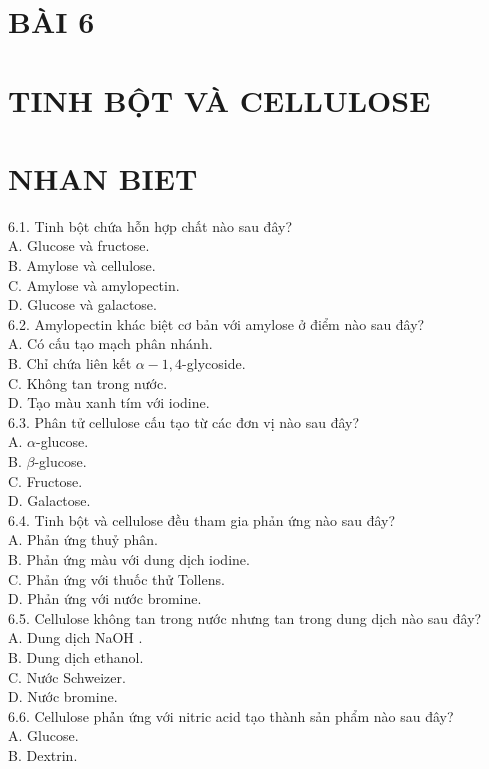 \documentclass[10pt]{article}
\begin{document}
\section*{BÀI 6}
\section*{TINH BỘT VÀ CELLULOSE}
\section*{NHAN BIET}
6.1. Tinh bột chứa hỗn hợp chất nào sau đây?\\
A. Glucose và fructose.\\
B. Amylose và cellulose.\\
C. Amylose và amylopectin.\\
D. Glucose và galactose.\\
6.2. Amylopectin khác biệt cơ bản với amylose ở điểm nào sau đây?\\
A. Có cấu tạo mạch phân nhánh.\\
B. Chỉ chứa liên kết $\alpha-1,4$-glycoside.\\
C. Không tan trong nước.\\
D. Tạo màu xanh tím với iodine.\\
6.3. Phân tử cellulose cấu tạo từ các đơn vị nào sau đây?\\
A. $\alpha$-glucose.\\
B. $\beta$-glucose.\\
C. Fructose.\\
D. Galactose.\\
6.4. Tinh bột và cellulose đều tham gia phản ứng nào sau đây?\\
A. Phản ứng thuỷ phân.\\
B. Phản ứng màu với dung dịch iodine.\\
C. Phản ứng với thuốc thử Tollens.\\
D. Phản ứng với nước bromine.\\
6.5. Cellulose không tan trong nước nhưng tan trong dung dịch nào sau đây?\\
A. Dung dịch NaOH .\\
B. Dung dịch ethanol.\\
C. Nước Schweizer.\\
D. Nước bromine.\\
6.6. Cellulose phả̉n ứng với nitric acid tạo thành sản phẩm nào sau đây?\\
A. Glucose.\\
B. Dextrin.\\
\end{document}
